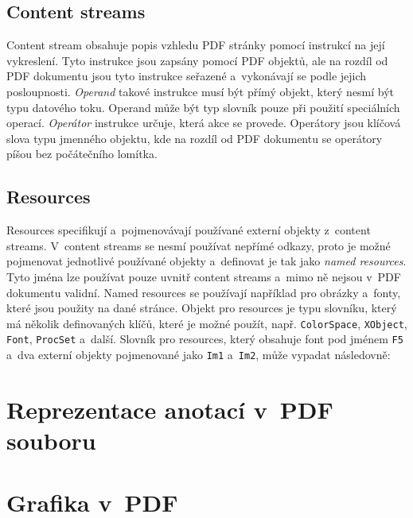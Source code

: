 \subsection*{Content streams}
Content stream obsahuje popis vzhledu PDF stránky pomocí instrukcí na její
vykreslení. Tyto instrukce jsou zapsány pomocí PDF objektů, ale na rozdíl od
PDF dokumentu jsou tyto instrukce seřazené a~vykonávají se podle jejich
posloupnosti. \emph{Operand} takové instrukce musí být přímý objekt, který 
nesmí být typu datového toku. Operand může být typ slovník pouze při použití
speciálních operací. \emph{Operátor} instrukce určuje, která akce se provede.
Operátory jsou klíčová slova typu jmenného objektu, kde na rozdíl od PDF dokumentu
se operátory píšou bez počátečního lomítka.


\subsection*{Resources}
Resources specifikují a~pojmenovávají používané externí objekty z~content streams.
V~content streams se nesmí používat nepřímé odkazy, proto je možné pojmenovat
jednotlivé používané objekty a~definovat je tak jako \emph{named resources}.
Tyto jména lze používat pouze uvnitř content streams a~mimo ně nejsou v~PDF
dokumentu validní. Named resources se používají například pro obrázky a~fonty,
které jsou použity na dané stránce. Objekt pro resources je typu slovníku, který
má několik definovaných klíčů, které je možné použít, např. \texttt{ColorSpace}, 
\texttt{XObject}, \texttt{Font}, \texttt{ProcSet} a~další. Slovník pro resources,
který obsahuje font pod jménem \texttt{F5} a~dva externí objekty pojmenované jako
\texttt{Im1} a~\texttt{Im2}, může vypadat následovně:


\section{Reprezentace anotací v~PDF souboru}

\DummyText



\section{Grafika v~PDF}

